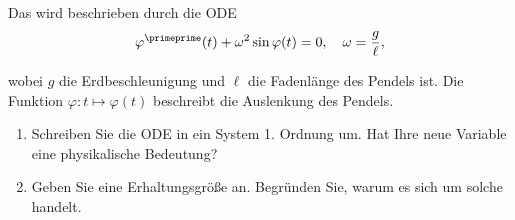 \begin{exercise}

Das  wird beschrieben durch die ODE
\begin{align*}
  \varphi^\primeprime(t) + \omega^2 \sin{\varphi(t)} = 0,
  \quad
  \omega = \frac{g}{\ell},
\end{align*}

wobei $g$ die Erdbeschleunigung und $\ell$ die Fadenlänge des Pendels ist. Die Funktion $\varphi: t \mapsto \varphi(t)$ beschreibt die Auslenkung des Pendels.

\begin{enumerate}[label = \textbf{\alph*)}]

  \item Schreiben Sie die ODE in ein System 1. Ordnung um. Hat Ihre neue Variable eine physikalische
  Bedeutung?

  \item Geben Sie eine Erhaltungsgröße an. Begründen Sie, warum es sich um solche handelt.

\end{enumerate}

\end{exercise}

